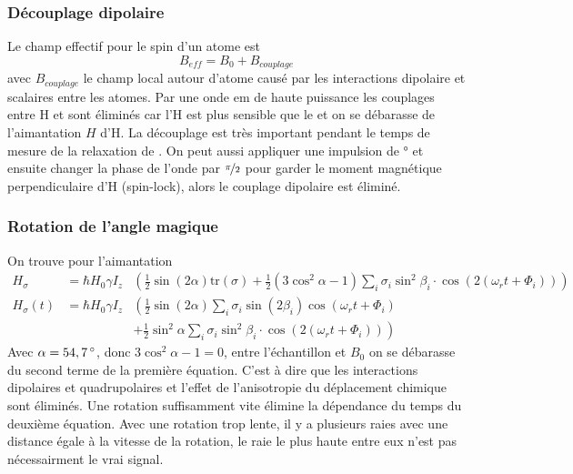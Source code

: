 \documentclass[a4paper,12pt]{scrartcl}
\begin{document}
   \subsubsection{Découplage dipolaire}
    Le champ effectif pour le spin d'un atome est
    \begin{equation*}
     B_{eff}=B_0 + B_{couplage} 
    \end{equation*}
    avec $B_{couplage}$ le champ local autour d'atome causé par les interactions dipolaire et scalaires entre les atomes. Par une onde em de haute puissance les couplages entre H et  sont éliminés car l'H est plus sensible que le  et on se  débarasse de l'aimantation $H$ d'H. La découplage est très important pendant le temps de mesure de la relaxation de . On peut aussi appliquer une impulsion de \unit[90]{\degree} et ensuite changer la phase de l'onde par $\nicefrac{\pi}{2}$ pour garder le moment magnétique perpendiculaire d'H (spin-lock), alors le couplage dipolaire est éliminé. 

   \subsubsection{Rotation de l'angle magique}
    On trouve pour l'aimantation
    \begin{eqnarray*}
     H_{\sigma}&=\hbar H_0\gamma I_z&\left(\frac{1}{2}\sin\left(2\alpha\right)\text{tr}\left(\sigma\right)+\frac{1}{2}\left(3\cos^2\alpha-1\right)\sum_i\sigma_i\sin^2\beta_i\cdot\cos\left(2\left(\omega_r t+\Phi_i\right)\right)\right)\\
     H_{\sigma}\left(t\right)&=\hbar H_0\gamma I_z&\left(\frac{1}{2}\sin\left(2\alpha\right)\sum_i\sigma_i\sin\left(2\beta_i\right)\cos\left(\omega_r t+\Phi_i\right)\right.\\
     &&\left.+\frac{1}{2}\sin^2\alpha \sum_i\sigma_i\sin^2\beta_i\cdot\cos\left(2\left(\omega_r t+\Phi_i\right)\right)\right)
    \end{eqnarray*}
    Avec $\alpha=\unit[54,7]{\degree}$, donc $3\cos^2\alpha-1=0$, entre l'échantillon et $B_0$ on se débarasse du second terme de la première équation. C'est à dire que les interactions dipolaires et quadrupolaires et l'effet de l'anisotropie du déplacement chimique sont éliminés. Une rotation suffisamment vite élimine la dépendance du temps du deuxième équation. Avec une rotation trop lente, il y a plusieurs raies avec une distance égale à la vitesse de la rotation, le raie le plus haute entre eux n'est pas nécessairment le vrai signal. 
\end{document}
